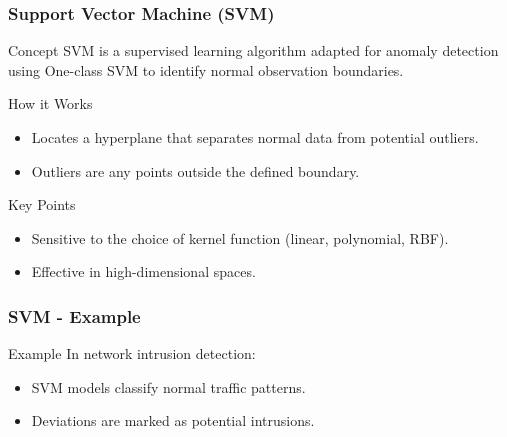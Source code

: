\documentclass{beamer}
\begin{document}
\begin{frame}[fragile]
    \frametitle{Support Vector Machine (SVM)}
    \begin{block}{Concept}
        SVM is a supervised learning algorithm adapted for anomaly detection using One-class SVM to identify normal observation boundaries.
    \end{block}
    \begin{block}{How it Works}
        \begin{itemize}
            \item Locates a hyperplane that separates normal data from potential outliers.
            \item Outliers are any points outside the defined boundary.
        \end{itemize}
    \end{block}
    \begin{block}{Key Points}
        \begin{itemize}
            \item Sensitive to the choice of kernel function (linear, polynomial, RBF).
            \item Effective in high-dimensional spaces.
        \end{itemize}
    \end{block}
\end{frame}

\begin{frame}[fragile]
    \frametitle{SVM - Example}
    \begin{block}{Example}
        In network intrusion detection:
        \begin{itemize}
            \item SVM models classify normal traffic patterns.
            \item Deviations are marked as potential intrusions.
        \end{itemize}
    \end{block}
\end{frame}
\end{document}
